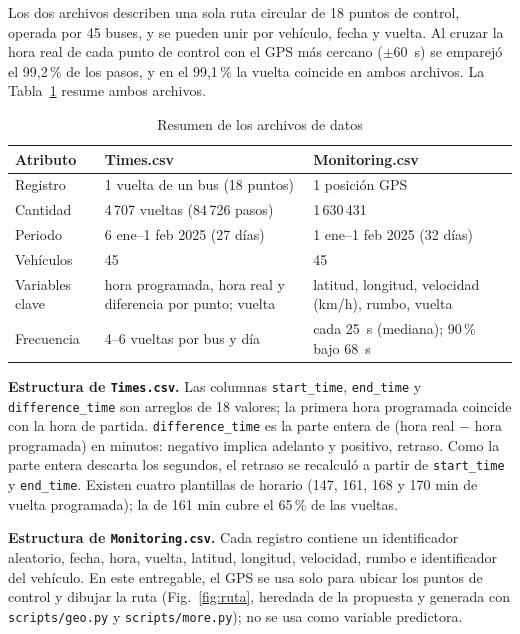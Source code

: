 \documentclass[conference,spanish]{IEEEtran}
\begin{document}
Los dos archivos describen una sola ruta circular de 18 puntos de control, operada por 45 buses, y se pueden unir por vehículo, fecha y vuelta. Al cruzar la hora real de cada punto de control con el GPS más cercano ($\pm$60~s) se emparejó el 99,2\,\% de los pasos, y en el 99,1\,\% la vuelta coincide en ambos archivos. La Tabla~\ref{tab:datasets} resume ambos archivos.

\begin{table}[h]
\centering
\caption{Resumen de los archivos de datos}
\label{tab:datasets}
\footnotesize
\begin{tabular}{@{}p{1.6cm}p{3.1cm}p{3.1cm}@{}}
\toprule
\textbf{Atributo} & \textbf{Times.csv} & \textbf{Monitoring.csv}\\
\midrule
Registro & 1 vuelta de un bus (18 puntos) & 1 posición GPS\\
Cantidad & 4\,707 vueltas (84\,726 pasos) & 1\,630\,431\\
Periodo & 6 ene--1 feb 2025 (27 días) & 1 ene--1 feb 2025 (32 días)\\
Vehículos & 45 & 45\\
Variables clave & hora programada, hora real y diferencia por punto; vuelta & latitud, longitud, velocidad (km/h), rumbo, vuelta\\
Frecuencia & 4--6 vueltas por bus y día & cada 25~s (mediana); 90\,\% bajo 68~s\\
\bottomrule
\end{tabular}
\end{table}

\textbf{Estructura de \texttt{Times.csv}.} Las columnas \texttt{start\_time}, \texttt{end\_time} y \texttt{difference\_time} son arreglos de 18 valores; la primera hora programada coincide con la hora de partida. \texttt{difference\_time} es la parte entera de (hora real $-$ hora programada) en minutos: negativo implica adelanto y positivo, retraso. Como la parte entera descarta los segundos, el retraso se recalculó a partir de \texttt{start\_time} y \texttt{end\_time}. Existen cuatro plantillas de horario (147, 161, 168 y 170 min de vuelta programada); la de 161 min cubre el 65\,\% de las vueltas.

\textbf{Estructura de \texttt{Monitoring.csv}.} Cada registro contiene un identificador aleatorio, fecha, hora, vuelta, latitud, longitud, velocidad, rumbo e identificador del vehículo. En este entregable, el GPS se usa solo para ubicar los puntos de control y dibujar la ruta (Fig.~\ref{fig:ruta}, heredada de la propuesta y generada con \texttt{scripts/geo.py} y \texttt{scripts/more.py}); no se usa como variable predictora.
\end{document}
